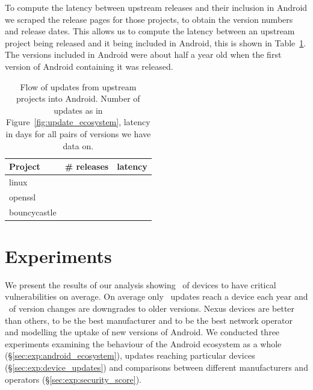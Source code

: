 \documentclass[conference,a4paper,twoside]{IEEEtran}
\let\OldTodo\todo
\renewcommand{\todo}{\OldTodo[inline]}
\newcommand{\todolater}[1]{}%
\begin{document}
To compute the latency between upstream releases and their inclusion in Android we scraped the release pages for those projects, to obtain the version numbers and release dates.
This allows us to compute the latency between an upstream project being released and it being included in Android, this is shown in Table~\ref{tab:update_ecosystem}.
The versions included in Android were about half a year old when the first version of Android containing it was released.
\begin{table}
\centering
\begin{tabular}{l|r|r}
Project	&	\# releases	&	latency \\ \hline
linux	&	\linuxNumVersions	&	\linuxMeanUpdateLatency \\
openssl	&	\opensslNumVersions	&	\opensslMeanUpdateLatency \\
bouncycastle	&	\bouncycastleNumVersions	&	\bouncycastleMeanUpdateLatency \\
\end{tabular}
\caption{Flow of updates from upstream projects into Android. Number of updates as in Figure~\ref{fig:update_ecosystem}, latency in days for all pairs of versions we have data on.\todolater{scrape the other 26 websites... is it worth it?}}
\label{tab:update_ecosystem}
\end{table}






\section{Experiments}
\label{sec:results}
We present the results of our analysis showing \daMeanInsecurityPerc\ of devices to have critical vulnerabilities on average.
On average only \daUpdatesPerYear\ updates reach a device each year and \daPercUpdatesDowngrades\ of version changes are downgrades to older versions.
Nexus devices are better than others, \emph{\daSecScoreBestmanufacturer} to be the best manufacturer and \emph{\daSecScoreBestoperator} to be the best network operator and modelling the uptake of new versions of Android.
We conducted three experiments examining the behaviour of the Android ecosystem as a whole (\S\ref{sec:exp:android_ecosystem}), updates reaching particular devices (\S\ref{sec:exp:device_updates}) and comparisons between different manufacturers and operators (\S\ref{sec:exp:security_score}).
\end{document}
